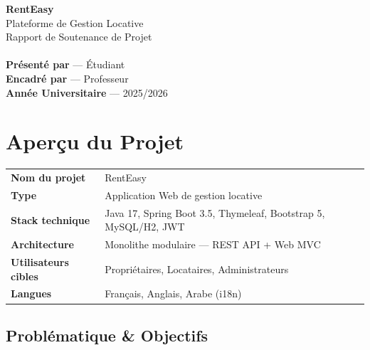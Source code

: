 \documentclass[12pt,a4paper]{article}
\begin{document}
\begin{titlepage}
\centering
\vspace*{2cm}
{\Huge\bfseries\color{reprimary} RentEasy}\\[0.8cm]
{\Large\color{redark} Plateforme de Gestion Locative}\\[0.5cm]
{\large\color{redark!60} Rapport de Soutenance de Projet}\\[2cm]
{\Large\faHome}\\[1cm]
\vfill
{\textbf{Présenté par} — Étudiant}\\[0.3cm]
{\textbf{Encadré par} — Professeur}\\[0.3cm]
{\textbf{Année Universitaire} — 2025/2026}
\end{titlepage}

\newpage
\tableofcontents
\newpage

\section{Aperçu du Projet}

\begin{tcolorbox}[colback=reprimary!5, colframe=reprimary!40,
  title=\textbf{Fiche d'Identité}, fonttitle=\bfseries]
  \begin{tabularx}{\textwidth}{lX}
    \textbf{Nom du projet} & RentEasy \\
    \textbf{Type} & Application Web de gestion locative \\
    \textbf{Stack technique} & Java 17, Spring Boot 3.5, Thymeleaf, Bootstrap 5, MySQL/H2, JWT \\
    \textbf{Architecture} & Monolithe modulaire — REST API + Web MVC \\
    \textbf{Utilisateurs cibles} & Propriétaires, Locataires, Administrateurs \\
    \textbf{Langues} & Français, Anglais, Arabe (i18n) \\
  \end{tabularx}
\end{tcolorbox}

\subsection{Problématique \& Objectifs}
\end{document}
